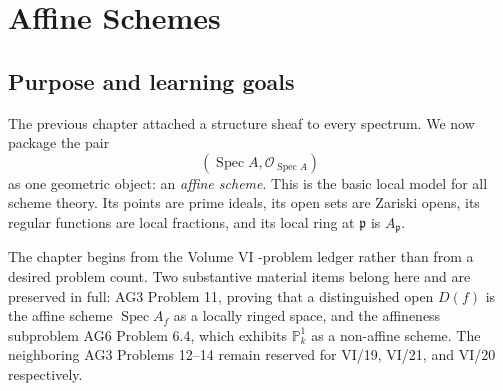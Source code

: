 
\chapter{Affine Schemes}
\label{ch:affine-schemes}
\providecommand{\OO}{\mathcal O}
\providecommand{\Spec}{\operatorname{Spec}}
\providecommand{\GammaX}{\Gamma(X,\mathcal O_X)}
\providecommand{\mfp}{\mathfrak p}
\providecommand{\mfq}{\mathfrak q}
\providecommand{\mfm}{\mathfrak m}
\providecommand{\Frac}{\operatorname{Frac}}
\providecommand{\A}{\mathbb A}
\providecommand{\Pj}{\mathbb P}
\providecommand{\Gm}{\mathbb G_m}
\providecommand{\kappaof}[1]{\kappa(#1)}

\section*{Purpose and learning goals}

The previous chapter attached a structure sheaf to every spectrum.  We now package the
pair
\[
  (\Spec A,\OO_{\Spec A})
\]
as one geometric object: an \emph{affine scheme}.  This is the basic local model for all
scheme theory.  Its points are prime ideals, its open sets are Zariski opens, its regular
functions are local fractions, and its local ring at $\mfp$ is $A_{\mfp}$.

The chapter begins from the Volume VI -problem ledger rather than from a desired
problem count.  Two substantive material items belong here and are preserved in full:
AG3 Problem 11, proving that a distinguished open $D(f)$ is the affine scheme
$\Spec A_f$ as a locally ringed space, and the affineness subproblem AG6 Problem 6.4,
which exhibits $\mathbb P^1_k$ as a non-affine scheme.  The neighboring AG3 Problems
12--14 remain reserved for VI/19, VI/21, and VI/20 respectively.

